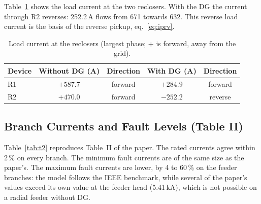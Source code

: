 \documentclass[12pt,letterpaper]{article}
\newcommand{\hd}{\rowcolor{headc}}
\begin{document}
Table~\ref{tab:lf} shows the load current at the two reclosers. With the DG the current through R2 reverses:
252.2\,A flows from 671 towards 632. This reverse load current is the basis of the reverse pickup,
eq.~\eqref{eq:iprv}.

\begin{table}[H]
\centering\small
\begin{tabular}{@{}lcccc@{}}
\toprule
\hd\textbf{Device} & \textbf{Without DG (A)} & \textbf{Direction} & \textbf{With DG (A)} & \textbf{Direction} \\
\midrule
R1 & $+587.7$ & forward & $+284.9$ & forward \\
R2 & $+470.0$ & forward & $-252.2$ & reverse \\
\bottomrule
\end{tabular}
\caption{Load current at the reclosers (largest phase; + is forward, away from the grid).}
\label{tab:lf}
\end{table}

\subsection{Branch Currents and Fault Levels (Table II)}
Table~\ref{tab:t2} reproduces Table~II of the paper. The rated currents agree within 2\,\% on every branch.
The minimum fault currents are of the same size as the paper's. The maximum fault currents are lower, by 4 to 60\,\% on the feeder branches: the
model follows the IEEE benchmark, while several of the paper's values exceed its own value at the feeder
head (5.41\,kA), which is not possible on a radial feeder without DG.
\end{document}
